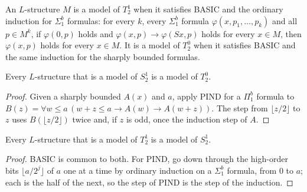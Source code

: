\begin{definition}
  \label{def:arithmetic-t12-models}
  \leanok
  \own{}
  \infrastructure{}
  An $L$-structure $M$ is a model of $T^1_2$ when it satisfies BASIC and the ordinary induction for
  $\Sigma^b_1$ formulas: for every $k$, every $\Sigma^b_1$ formula $\varphi(x, p_1, \dots, p_k)$ and
  all $p \in M^k$, if $\varphi(0, p)$ holds and $\varphi(x, p) \to \varphi(Sx, p)$ holds for every
  $x \in M$, then $\varphi(x, p)$ holds for every $x \in M$. It is a model of $T^0_2$ when it
  satisfies BASIC and the same induction for the sharply bounded formulas.
\end{definition}

\begin{theorem}
  \label{thm:arithmetic-s12-contains-t02}
  \leanok
  Every $L$-structure that is a model of $S^1_2$ is a model of $T^0_2$.
\end{theorem}

\begin{proof}
  \leanok
  Given a sharply bounded $A(x)$ and $a$, apply PIND for a $\Pi^b_1$ formula to $B(z) = \forall w \le
  a\,(w + z \le a \to A(w) \to A(w + z))$. The step from $\lfloor z/2 \rfloor$ to $z$ uses $B(\lfloor
  z/2 \rfloor)$ twice and, if $z$ is odd, once the induction step of $A$.
\end{proof}

\begin{theorem}
  \label{thm:arithmetic-t12-contains-s12}
  \leanok
  Every $L$-structure that is a model of $T^1_2$ is a model of $S^1_2$.
\end{theorem}

\begin{proof}
  \leanok
  BASIC is common to both. For PIND, go down through the high-order bits $\lfloor a/2^j \rfloor$ of
  $a$ one at a time by ordinary induction on a $\Sigma^b_1$ formula, from $0$ to $a$; each is the half
  of the next, so the step of PIND is the step of the induction.
\end{proof}

